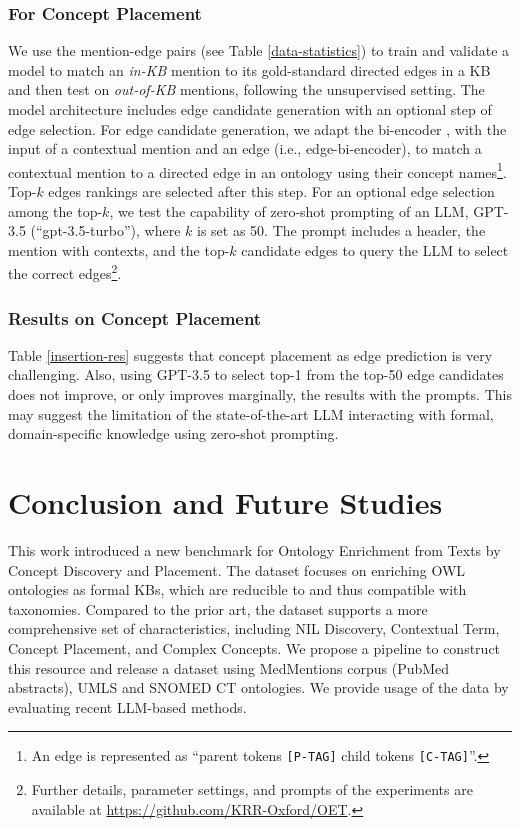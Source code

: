 \documentclass[sigconf]{acmart}
\begin{document}
\subsubsection*{For Concept Placement} We use the mention-edge pairs (see Table \ref{data-statistics}) to train and validate a model to match an \textit{in-KB} mention to its gold-standard directed edges in a KB and then test on \textit{out-of-KB} mentions, following the unsupervised setting. The model architecture includes edge candidate generation with an optional step of edge selection. For edge candidate generation, we adapt the bi-encoder  \cite{wu2020blink}, with the input of a contextual mention and an edge  (i.e., edge-bi-encoder), to match a contextual mention to a directed edge in an ontology using their concept names\footnote{An edge is represented as ``parent tokens \texttt{[P-TAG]} child tokens \texttt{[C-TAG]}''.}. Top-$k$ edges rankings are selected after this step. For an optional edge selection among the top-$k$, we test the capability of zero-shot prompting of an LLM, GPT-3.5 (``gpt-3.5-turbo''), where $k$ is set as 50. The prompt includes a header, the mention with contexts, and the top-$k$ candidate edges to query the LLM to select the correct edges\footnote{Further details, parameter settings, and prompts of the experiments are available at \url{https://github.com/KRR-Oxford/OET}.}.

\subsubsection*{Results on Concept Placement} 
Table \ref{insertion-res} suggests that concept placement as edge prediction is very challenging. Also, using GPT-3.5 to select top-1 from the top-50 edge candidates does not improve, or only improves marginally, the results with the prompts. This may suggest the limitation of the state-of-the-art LLM interacting with formal, domain-specific knowledge using zero-shot prompting. 

\section{Conclusion and Future Studies}
This work introduced a new benchmark for Ontology Enrichment from Texts by Concept Discovery and Placement. The dataset focuses on enriching OWL ontologies as formal KBs, which are reducible to and thus compatible with taxonomies. Compared to the prior art, the dataset supports a more comprehensive set of characteristics, including NIL Discovery, Contextual Term, Concept Placement, and Complex Concepts. We propose a pipeline to construct this resource and release a dataset using MedMentions corpus (PubMed abstracts), UMLS and SNOMED CT ontologies. We provide usage of the data by evaluating recent LLM-based methods. 
\end{document}
